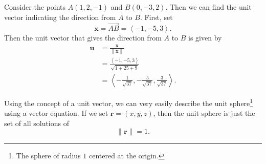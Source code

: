 \documentclass[10pt,]{book}
\theoremstyle{ptxplainnotitle}
\theoremstyle{ptxplaintitle}
\theoremstyle{ptxplainnotitle}
\theoremstyle{ptxplaintitle}
\theoremstyle{ptxplainnotitle}
\theoremstyle{ptxplaintitle}
\theoremstyle{ptxdefinitionnotitle}
\theoremstyle{ptxdefinitiontitle}
\theoremstyle{ptxdefinitionnotitle}
\theoremstyle{ptxdefinitiontitle}
\theoremstyle{ptxdefinitionnotitle}
\theoremstyle{ptxdefinitiontitle}
\theoremstyle{ptxdefinitionnotitle}
\theoremstyle{ptxdefinitiontitle}
\theoremstyle{ptxdefinitionnotitle}
\theoremstyle{ptxdefinitiontitle}
\numberwithin{equation}{section}
\newcommand{\vv}[1]{\mathbf{#1}}
\newcommand{\dotprod}[1]{\left\langle #1 \right\rangle}
\begin{document}
\begin{example}\label{example-direction-from-one-point-to-another}
\hypertarget{p-771}{}%
Consider the points \(A(1,2,-1)\) and \(B(0,-3,2)\). Then we can find the unit vector indicating the direction from \(A\) to \(B\). First, set%
%
\begin{equation*}
\vv{x} = \overrightarrow{AB} = \dotprod{-1,-5,3}.
\end{equation*}
\hypertarget{p-772}{}%
Then the unit vector that gives the direction from \(A\) to \(B\) is given by%
%
\begin{align*}
\vv{u} & = \frac{\vv{x}}{\|\vv{x}\|} \\
& = \frac{\dotprod{-1,-5,3}}{\sqrt{1+25+9}} \\
& = \dotprod{-\frac{1}{\sqrt{37}}, -\frac{5}{\sqrt{37}}, \frac{3}{\sqrt{37}}}. 
\end{align*}
\end{example}
\begin{example}\label{example-a-vector-equation-for-the-unit-sphere}
\hypertarget{p-773}{}%
Using the concept of a unit vector, we can very easily describe the unit sphere\footnote{The sphere of radius \(1\) centered at the origin.\label{fn-3}} using a vector equation. If we set \(\vv{r} = (x,y,z)\), then the unit sphere is just the set of all solutions of%
%
\begin{equation*}
\|\vv{r}\| = 1.
\end{equation*}
\end{example}
\typeout{************************************************}
\typeout{************************************************}
\end{document}
